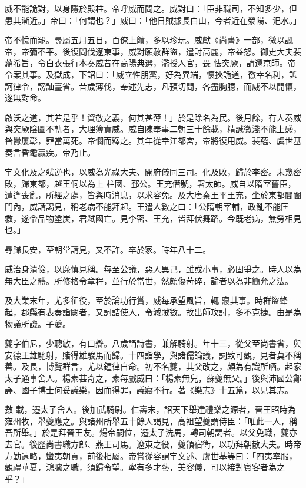 \begin{pinyinscope}
 威不能詭對，以身隱於殿柱。帝呼威而問之。威對曰：「臣非職司，不知多少，但患其漸近。」帝曰：「何謂也？」威曰：「他日賊據長白山，今者近在滎陽、汜水。」



 帝不悅而罷。尋屬五月五日，百僚上饋，多以珍玩。威獻《尚書》一部，微以諷帝，帝彌不平。後復問伐遼東事，威對願赦群盜，遣討高麗，帝益怒。御史大夫裴蘊希旨，令白衣張行本奏威昔在高陽典選，濫授人官，畏
 怯突厥，請還京師。帝令案其事。及獄成，下詔曰：「威立性朋黨，好為異端，懷挾詭道，徼幸名利，詆訶律令，謗訕臺省。昔歲薄伐，奉述先志，凡預切問，各盡胸臆，而威不以開懷，遂無對命。



 啟沃之道，其若是乎！資敬之義，何其甚薄！」於是除名為民。後月餘，有人奏威與突厥陰圖不軌者，大理簿責威。威自陳奉事二朝三十餘載，精誠微淺不能上感，咎釁屢彰，罪當萬死。帝憫而釋之。其年從幸江都宮，帝將復用威。裴蘊、虞世基奏言昏耄贏疾。帝乃止。



 宇文化及之弒逆也，以威為光祿大夫、開府儀同三司。化及敗，歸於李密。未幾密敗，歸東都，越王侗以為上
 柱國、邳公。王充僭號，署太師。威自以隋室舊臣，遭逢喪亂，所經之處，皆與時消息，以求容免。及大唐秦王平王充，坐於東都閶闔門內，威請謁見，稱老病不能拜起。王遣人數之曰：「公隋朝宰輔，政亂不能匡救，遂令品物塗炭，君弒國亡。見李密、王充，皆拜伏舞蹈。今既老病，無勞相見也。」



 尋歸長安，至朝堂請見，又不許。卒於家。時年八十二。



 威治身清儉，以廉慎見稱。每至公議，惡人異己，雖或小事，必固爭之。時人以為無大臣之體。所修格令章程，並行於當世，然頗傷苛碎，論者以為非簡允之法。



 及大業末年，尤多征役，至於論功行賞，威每承望風旨，輒
 寢其事。時群盜蜂起，郡縣有表奏詣闕者，又訶詰使人，令減賊數。故出師攻討，多不克捷。由是為物議所譏。子夔。



 夔字伯尼，少聰敏，有口辯。八歲誦詩書，兼解騎射。年十三，從父至尚書省，與安德王雄馳射，賭得雄駿馬而歸。十四詣學，與諸儒論議，詞致可觀，見者莫不稱善。及長，博覽群言，尤以鐘律自命。初不名夔，其父改之，頗為有識所哂。起家太子通事舍人。楊素甚奇之，素每戲威曰：「楊素無兒，蘇夔無父。」後與沛國公鄭譯、國子博士何妥議樂，因而得罪，議寢不行。著《樂志》十五篇，以見其志。



 數
 載，遷太子舍人。後加武騎尉。仁壽末，詔天下舉達禮樂之源者，晉王昭時為雍州牧，舉夔應之。與諸州所舉五十餘人謁見，高祖望夔謂侍臣：「唯此一人，稱吾所舉。」於是拜晉王友。煬帝嗣位，遷太子洗馬，轉司朝謁者。以父免職，夔亦去官。後歷尚書職方郎、燕王司馬。遼東之役，夔領宿衛，以功拜朝散大夫。時帝方勤遠略，蠻夷朝貢，前後相屬。帝嘗從容謂宇文述、虞世基等曰：「四夷率服，觀禮華夏，鴻臚之職，須歸令望。寧有多才藝，美容儀，可以接對賓客者為之乎？」




\end{pinyinscope}
